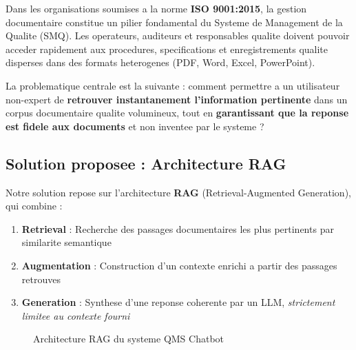 \documentclass[12pt,a4paper]{article}
\begin{document}
Dans les organisations soumises a la norme \textbf{ISO 9001:2015}, la gestion documentaire
constitue un pilier fondamental du Systeme de Management de la Qualite (SMQ). Les operateurs,
auditeurs et responsables qualite doivent pouvoir acceder rapidement aux procedures,
specifications et enregistrements qualite disperses dans des formats heterogenes
(PDF, Word, Excel, PowerPoint).

La problematique centrale est la suivante : comment permettre a un utilisateur non-expert
de \textbf{retrouver instantanement l'information pertinente} dans un corpus documentaire
qualite volumineux, tout en \textbf{garantissant que la reponse est fidele aux documents}
et non inventee par le systeme ?

\subsection{Solution proposee : Architecture RAG}

Notre solution repose sur l'architecture \textbf{RAG} (Retrieval-Augmented Generation),
qui combine :

\begin{enumerate}
  \item \textbf{Retrieval} : Recherche des passages documentaires les plus pertinents
        par similarite semantique
  \item \textbf{Augmentation} : Construction d'un contexte enrichi a partir des passages retrouves
  \item \textbf{Generation} : Synthese d'une reponse coherente par un LLM, \emph{strictement
        limitee au contexte fourni}
\end{enumerate}

\begin{figure}[h]
\centering
{}
\caption{Architecture RAG du systeme QMS Chatbot}
\label{fig:rag-architecture}
\end{figure}
\end{document}

